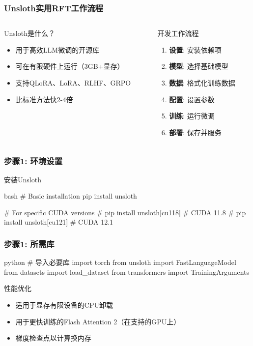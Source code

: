 \documentclass[aspectratio=169]{beamer}
\begin{document}
\begin{frame}[shrink=60]
	\frametitle{Unsloth实用RFT工作流程}
	\begin{columns}[T]
		\begin{column}{0.48\textwidth}
			\begin{block}{Unsloth是什么？}
				\begin{itemize}
					\item 用于高效LLM微调的开源库
					\item 可在有限硬件上运行（3GB+显存）
					\item 支持QLoRA、LoRA、RLHF、GRPO
					\item 比标准方法快2-4倍
				\end{itemize}
			\end{block}
		\end{column}
		\begin{column}{0.48\textwidth}
			\begin{block}{开发工作流程}
				\begin{enumerate}
					\item \textbf{设置}: 安装依赖项
					\item \textbf{模型}: 选择基础模型
					\item \textbf{数据}: 格式化训练数据
					\item \textbf{配置}: 设置参数
					\item \textbf{训练}: 运行微调
					\item \textbf{部署}: 保存并服务
				\end{enumerate}
			\end{block}
		\end{column}
	\end{columns}
\end{frame}

\begin{frame}[fragile]
	\frametitle{步骤1: 环境设置}
	\begin{block}{安装Unsloth}
		\begin{mintedbox}{bash}
# Basic installation
pip install unsloth

# For specific CUDA versions
# pip install unsloth[cu118]  # CUDA 11.8
# pip install unsloth[cu121]  # CUDA 12.1
		\end{mintedbox}
	\end{block}
\end{frame}

\begin{frame}[fragile]
	\frametitle{步骤1: 所需库}
	\begin{mintedbox}{python}
# 导入必要库
import torch
from unsloth import FastLanguageModel
from datasets import load_dataset
from transformers import TrainingArguments
	\end{mintedbox}
	\begin{block}{性能优化}
		\begin{itemize}
			\item 适用于显存有限设备的CPU卸载
			\item 用于更快训练的Flash Attention 2（在支持的GPU上）
			\item 梯度检查点以计算换内存
		\end{itemize}
	\end{block}
\end{frame}
\end{document}
